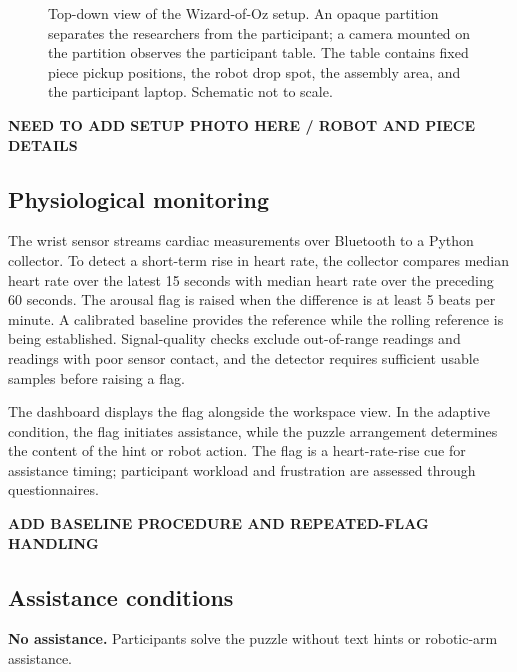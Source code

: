 \documentclass[sigconf]{aamas}
\begin{document}
\begin{figure}[t]
\centering
\begingroup
\resizebox{.83\textwidth}{!}{}
\endgroup
\caption{Top-down view of the Wizard-of-Oz setup. An opaque partition separates the researchers from the participant; a camera mounted on the partition observes the participant table. The table contains fixed piece pickup positions, the robot drop spot, the assembly area, and the participant laptop. Schematic not to scale.}
\label{fig:setup}
\end{figure}

\textbf{NEED TO ADD SETUP PHOTO HERE / ROBOT AND PIECE DETAILS}

\subsection{Physiological monitoring}

The wrist sensor streams cardiac measurements over Bluetooth to a Python collector. To detect a short-term rise in heart rate, the collector compares median heart rate over the latest 15 seconds with median heart rate over the preceding 60 seconds. The arousal flag is raised when the difference is at least 5 beats per minute. A calibrated baseline provides the reference while the rolling reference is being established. Signal-quality checks exclude out-of-range readings and readings with poor sensor contact, and the detector requires sufficient usable samples before raising a flag.

The dashboard displays the flag alongside the workspace view. In the adaptive condition, the flag initiates assistance, while the puzzle arrangement determines the content of the hint or robot action. The flag is a heart-rate-rise cue for assistance timing; participant workload and frustration are assessed through questionnaires.

\textbf{ADD BASELINE PROCEDURE AND REPEATED-FLAG HANDLING}

\subsection{Assistance conditions}

\textbf{No assistance.} Participants solve the puzzle without text hints or robotic-arm assistance.
\end{document}
